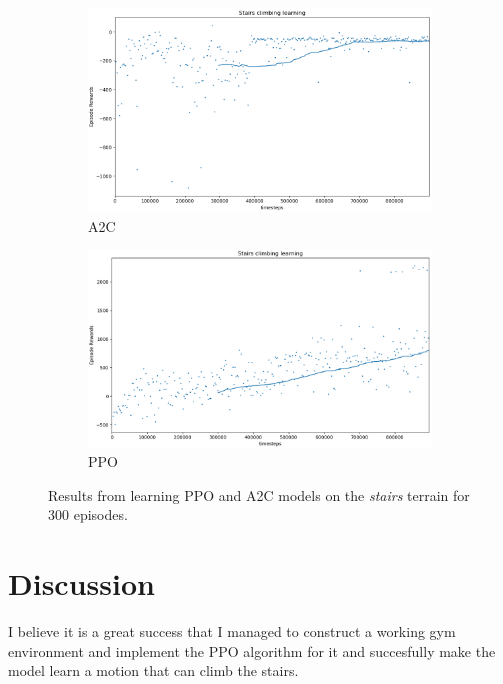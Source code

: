 \documentclass{article}
\begin{document}
\begin{figure}[ht]
\begin{subfigure}{.5\textwidth}
  \centering
  \includegraphics[width=.95\linewidth]{figc/Stairs_climbing_learning_300ep_final_a2c.png}  
  \caption{A2C}
  \label{fig:sub-first}
\end{subfigure}
\begin{subfigure}{.5\textwidth}
  \centering
  \includegraphics[width=.95\linewidth]{figc/Stairs_climbing_learning_300ep_final.png}  
  \caption{PPO}
  \label{fig:sub-second}
\end{subfigure}
\caption{Results from learning PPO and A2C models on the \textit{stairs} terrain for 300 episodes.}
\label{fig:stairs}
\end{figure}
\section{Discussion}
I believe it is a great success that I managed to construct a working gym environment and implement the PPO algorithm for it and succesfully make the model learn a motion that can climb the stairs.
\end{document}
